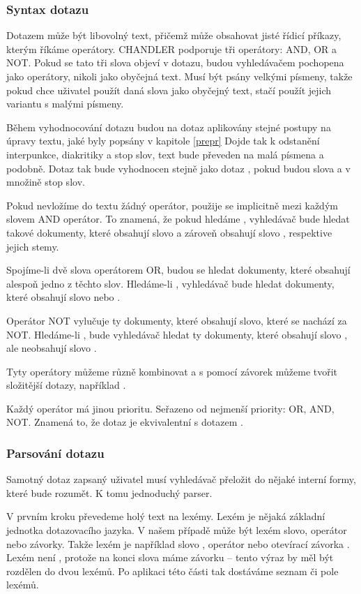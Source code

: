 \documentclass[12pt]{article}
\newcommand{\name}{CHANDLER}
\newcommand{\sssection}[1]{\subsubsection{#1}}
\begin{document}
\sssection{Syntax dotazu}
Dotazem může být libovolný text, přičemž může obsahovat jisté řídicí příkazy, kterým říkáme operátory. \name{} podporuje tři operátory: AND, OR a NOT. Pokud se tato tři slova objeví v dotazu, budou vyhledávačem pochopena jako operátory, nikoli jako obyčejná text. Musí být psány velkými písmeny, takže pokud chce uživatel použít daná slova jako obyčejný text, stačí použít jejich variantu s malými písmeny. 

Během vyhodnocování dotazu budou na dotaz aplikovány stejné postupy na úpravy textu, jaké byly popsány v kapitole \ref{prepr} Dojde tak k odstanění interpunkce, diakritiky a stop slov, text bude převeden na malá písmena a podobně. Dotaz  tak bude vyhodnocen stejně jako dotaz , pokud budou slova  a  v množině stop slov. 

Pokud nevložíme do textu žádný operátor, použije se implicitně mezi každým slovem AND operátor. To znamená, že pokud hledáme , vyhledávač bude hledat takové dokumenty, které obsahují slovo  a zároveň obsahují slovo , respektive jejich stemy. 

Spojíme-li dvě slova operátorem OR, budou se hledat dokumenty, které obsahují alespoň jedno z těchto slov. Hledáme-li , vyhledávač bude hledat dokumenty, které obsahují slovo  nebo .

Operátor NOT vylučuje ty dokumenty, které obsahují slovo, které se nachází za NOT. Hledáme-li , bude vyhledávač hledat ty dokumenty, které obsahují slovo , ale neobsahují slovo . 

Tyty operátory můžeme různě kombinovat a s pomocí závorek můžeme tvořit složitější dotazy, například . 

Každý operátor má jinou prioritu. Seřazeno od nejmenší priority: OR, AND, NOT. Znamená to, že dotaz  je ekvivalentní s dotazem .

\sssection{Parsování dotazu}

Samotný dotaz zapsaný uživatel musí vyhledávač přeložit do nějaké interní formy, které bude rozumět. K tomu jednoduchý parser. 

V prvním kroku převedeme holý text na lexémy. Lexém je nějaká základní jednotka dotazovacího jazyka. V našem případě může být lexém slovo, operátor nebo závorky. Takže lexém je například slovo , operátor  nebo otevírací závorka \uv{(}. Lexém není , protože na konci slova máme závorku -- tento výraz by měl být rozdělen do dvou lexémů. Po aplikaci této části tak dostáváme seznam či pole lexémů. 
\end{document}
